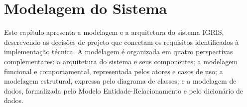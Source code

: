 ﻿\chapter{Modelagem do Sistema}
\label{cap:modelagem}

Este capítulo apresenta a modelagem e a arquitetura do sistema IGRIS, descrevendo as decisões de projeto que conectam os requisitos identificados à implementação técnica. A modelagem é organizada em quatro perspectivas complementares: a arquitetura do sistema e seus componentes; a modelagem funcional e comportamental, representada pelos atores e casos de uso; a modelagem estrutural, expressa pelo diagrama de classes; e a modelagem de dados, formalizada pelo Modelo Entidade-Relacionamento e pelo dicionário de dados.






